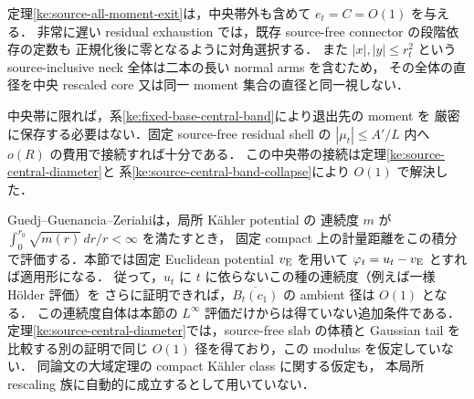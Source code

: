 定理\ref{ke:source-all-moment-exit}は，中央帯外も含めて
$e_t=C=O(1)$ を与える．
非常に遅い residual exhaustion では，既存 source-free connector の段階依存の定数も
正規化後に零となるように対角選択する．
また $|x|,|y|\le r_t^2$ という source-inclusive neck 全体は二本の長い normal arms を含むため，
その全体の直径を中央 rescaled core 又は同一 moment 集合の直径と同一視しない．

中央帯に限れば，系\ref{ke:fixed-base-central-band}により退出先の moment を
厳密に保存する必要はない．固定 source-free residual shell の
$|\mu_t|\le A'/L$ 内へ $o(R)$ の費用で接続すれば十分である．
この中央帯の接続は定理\ref{ke:source-central-diameter}と
系\ref{ke:source-central-band-collapse}により $O(1)$ で解決した．

\begin{remark}
\label{ke:source-potential-modulus}
Guedj--Guenancia--Zeriahi\cite[Proposition~1.4]{GGZDiameter}は，局所 K\"ahler potential の
連続度 $m$ が $\int_0^{r_0}\sqrt{m(r)}\,dr/r<\infty$ を満たすとき，
固定 compact 上の計量距離をこの積分で評価する．本節では固定 Euclidean potential
$v_{\rm E}$ を用いて $\varphi_t=u_t-v_{\rm E}$ とすれば適用形になる．
従って，$u_t$ に $t$ に依らないこの種の連続度（例えば一様 H\"older 評価）を
さらに証明できれば，$\overline{B_t(c_1)}$ の ambient 径は $O(1)$ となる．
この連続度自体は本節の $L^\infty$ 評価だけからは得ていない追加条件である．
定理\ref{ke:source-central-diameter}では，source-free slab の体積と Gaussian tail を
比較する別の証明で同じ $O(1)$ 径を得ており，この modulus を仮定していない．
同論文の大域定理の compact K\"ahler class に関する仮定も，
本局所 rescaling 族に自動的に成立するとして用いていない．
\end{remark}
